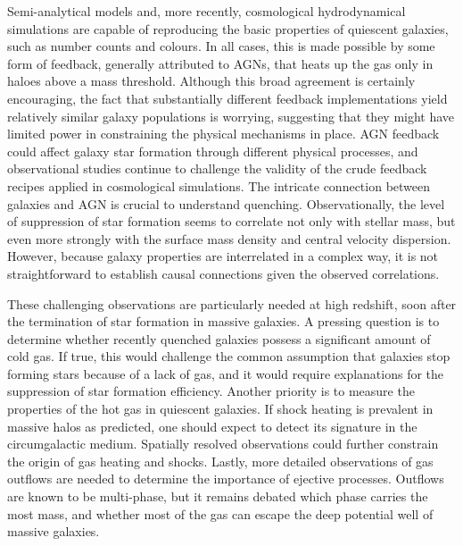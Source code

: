 \documentclass[a4paper,10pt]{article}
\begin{document}
{\noindent}Semi-analytical models and, more recently, cosmological hydrodynamical simulations are capable of reproducing the basic properties of quiescent galaxies, such as number counts and colours. In all cases, this is made possible by some form of feedback, generally attributed to AGNs, that heats up the gas only in haloes above a mass threshold. Although this broad agreement is certainly encouraging, the fact that substantially different feedback implementations yield relatively similar galaxy populations is worrying, suggesting that they might have limited power in constraining the physical mechanisms in place. AGN feedback could affect galaxy star formation through different physical processes, and observational studies continue to challenge the validity of the crude feedback recipes applied in cosmological simulations. The intricate connection between galaxies and AGN is crucial to understand quenching. Observationally, the level of suppression of star formation seems to correlate not only with stellar mass, but even more strongly with the surface mass density and central velocity dispersion. However, because galaxy properties are interrelated in a complex way, it is not straightforward to establish causal connections given the observed correlations.

{\noindent} These challenging observations are particularly needed at high redshift, soon after the termination of star formation in massive galaxies. A pressing question is to determine whether recently quenched galaxies possess a significant amount of cold gas. If true, this would challenge the common assumption that galaxies stop forming stars because of a lack of gas, and it would require explanations for the suppression of star formation efficiency. Another priority is to measure the properties of the hot gas in quiescent galaxies. If shock heating is prevalent in massive halos as predicted, one should expect to detect its signature in the circumgalactic medium. Spatially resolved observations could further constrain the origin of gas heating and shocks. Lastly, more detailed observations of gas outflows are needed to determine the importance of ejective processes. Outflows are known to be multi-phase, but it remains debated which phase carries the most mass, and whether most of the gas can escape the deep potential well of massive galaxies.
\end{document}
